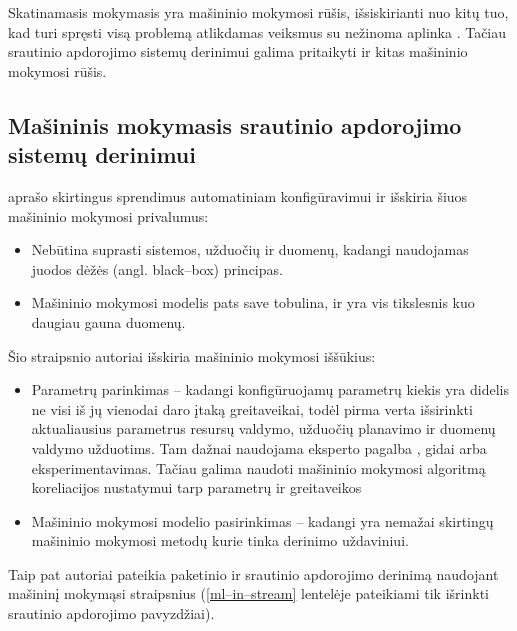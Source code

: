 \documentclass{VUMIFPSbakalaurinis}
\begin{document}
Skatinamasis mokymasis yra mašininio mokymosi rūšis, išsiskirianti nuo kitų tuo, kad turi spręsti visą problemą atlikdamas veiksmus su nežinoma aplinka \cite{sutton2018reinforcement}. Tačiau srautinio apdorojimo sistemų derinimui galima pritaikyti ir kitas mašininio mokymosi rūšis.

\subsection{Mašininis mokymasis srautinio apdorojimo sistemų derinimui}

\cite{herodotou2020survey} aprašo skirtingus sprendimus automatiniam konfigūravimui ir išskiria šiuos mašininio mokymosi privalumus:
\begin{itemize}
    \item Nebūtina suprasti sistemos, užduočių ir duomenų, kadangi naudojamas juodos dėžės (angl. black–box) principas.
    \item Mašininio mokymosi modelis pats save tobulina, ir yra vis tikslesnis kuo daugiau gauna duomenų. 
\end{itemize}
Šio straipsnio autoriai išskiria mašininio mokymosi iššūkius: 
\begin{itemize}
    \item Parametrų parinkimas – kadangi konfigūruojamų parametrų kiekis yra didelis \cite{Bilal2017Towards, petridis2016spark} ne visi iš jų vienodai daro įtaką greitaveikai, todėl pirma verta išsirinkti aktualiausius parametrus resursų valdymo, užduočių planavimo ir duomenų valdymo užduotims. Tam dažnai naudojama eksperto pagalba \cite{wang2016novel}, gidai arba eksperimentavimas. Tačiau galima naudoti mašininio mokymosi algoritmą koreliacijos nustatymui tarp parametrų ir greitaveikos \cite{vaquero2018autotuning, yang2012statistics}
    \item Mašininio mokymosi modelio pasirinkimas – kadangi yra nemažai skirtingų mašininio mokymosi metodų kurie tinka derinimo uždaviniui.
\end{itemize} 
Taip pat autoriai pateikia paketinio ir srautinio apdorojimo derinimą naudojant mašininį mokymąsi straipsnius (\ref{ml–in–stream} lentelėje pateikiami tik išrinkti srautinio apdorojimo pavyzdžiai).
\end{document}
